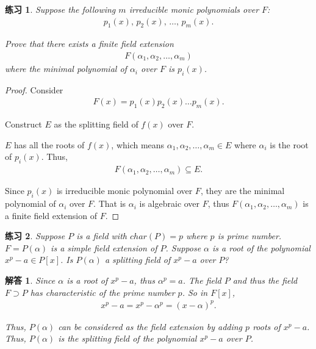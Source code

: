 \documentclass[utf8]{ctexbook}
\newtheorem{exercise}{练习}[section]
\newtheorem*{soln}{解答}
\begin{document}
\begin{exercise}
Suppose the following $m$ irreducible monic polynomials over $F$:
\begin{align*}
p_1(x), \, p_2 (x), \, \ldots , \, p_m(x) .
\end{align*}

Prove that there exists a finite field extension 
\begin{align*}
F(\alpha_1, \alpha_2, \ldots, \alpha_m)
\end{align*}
where the minimal polynomial of $\alpha_i$ over $F$ is $p_i (x)$.
\end{exercise}

\begin{proof}
Consider
\begin{align*}
F(x) = p_1 (x) p_2 (x) \ldots p_m (x) .
\end{align*}

Construct $E$ as the splitting field of $f(x)$ over $F$.

$E$ has all the roots of $f(x)$, which means $\alpha_1, \alpha_2, \ldots, \alpha_m \in E$ where $\alpha_i$ is the root of $p_i (x)$. Thus,
\begin{align*}
F(\alpha_1, \alpha_2, \ldots, \alpha_m) \subseteq E .
\end{align*}

Since $p_i (x)$ is irreducible monic polynomial over $F$, they are the minimal polynomial of $\alpha_i$ over $F$. That is $\alpha_i$ is algebraic over $F$, thus $ F(\alpha_1, \alpha_2, \ldots, \alpha_m)  $ is a finite field extension of $F$.

\end{proof}


\begin{exercise}
Suppose $P$ is a field with $char(P) = p$ where $p$ is prime number. $F = P (\alpha)$ is a simple field extension of $P$. Suppose $\alpha$ is a root of the polynomial $x^p - a \in P[x]$. Is $P(\alpha)$ a splitting field of $x^p -a$ over $P$?

\end{exercise}

\begin{soln}
Since $\alpha$ is a root of $x^p -a$, thus $\alpha^p = a$. The field $P$ and thus the field $F \supset P$ has characteristic of the prime number $p$. So in $F[x]$,
\begin{align*}
x^p -a = x^p - \alpha^p  = (x - \alpha)^p .
\end{align*}

Thus, $P(\alpha)$ can be considered as the field extension by adding $p$ roots of $x^p -a$. Thus, $P(\alpha)$ is the splitting field of the polynomial $x^p -a $ over $P$.


\end{soln}
\end{document}
